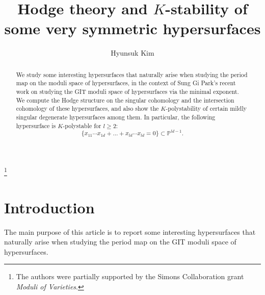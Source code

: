 \documentclass[letterpaper,11pt]{amsart}
\theoremstyle{plain}
\theoremstyle{definition}
\theoremstyle{remark}
\newcommand{\PP}{\mathbb{P}}
\begin{document}
	\thanks{The authors were partially supported by the Simons Collaboration grant \textit{Moduli of Varieties}.}
	
	
	\author{Hyunsuk Kim}
	
	\address{Department of Mathematics, University of Michigan, 530 Church Street, Ann Arbor, MI 48109, USA}
	
	
	\title[Hodge theory and $K$-stability of some very symmetric hypersurfaces]{Hodge theory and $K$-stability of some very symmetric hypersurfaces}
	
	\maketitle
    \begin{abstract}
        We study some interesting hypersurfaces that naturally arise when studying the period map on the moduli space of hypersurfaces, in the context of Sung Gi Park's recent work on studying the GIT moduli space of hypersurfaces via the minimal exponent. We compute the Hodge structure on the singular cohomology and the intersection cohomology of these hypersurfaces, and also show the $K$-polystability of certain mildly singular degenerate hypersurfaces among them. In particular, the following hypersurface is $K$-polystable for $l \geq 2$:
        $$ \{ x_{11}\cdots x_{1d} + \ldots + x_{ld} \cdots x_{ld} = 0\} \subset \PP^{ld-1}.$$
	\end{abstract}
	

    \section{Introduction}    
    The main purpose of this article is to report some interesting hypersurfaces that naturally arise when studying the period map on the GIT moduli space of hypersurfaces.
    
\end{document}
